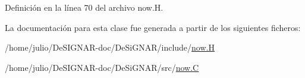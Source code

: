 Definición en la línea 70 del archivo now.\+H.



La documentación para esta clase fue generada a partir de los siguientes ficheros\+:\begin{DoxyCompactItemize}
\item 
/home/julio/\+De\+S\+I\+G\+N\+A\+R-\/doc/\+De\+Si\+G\+N\+A\+R/include/\hyperlink{now_8_h}{now.\+H}\item 
/home/julio/\+De\+S\+I\+G\+N\+A\+R-\/doc/\+De\+Si\+G\+N\+A\+R/src/\hyperlink{now_8_c}{now.\+C}\end{DoxyCompactItemize}
